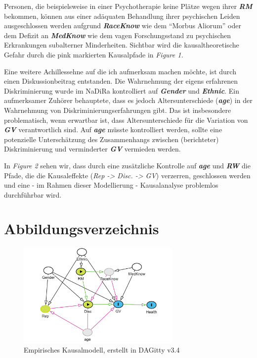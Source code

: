 \documentclass[
  11pt,
  oneside]{article}
\begin{document}
Personen, die beispielsweise in einer Psychotherapie keine Plätze wegen
ihrer \textbf{\emph{RM}} bekommen, können aus einer adäquaten Behandlung
ihrer psychischen Leiden ausgeschlossen werden aufgrund
\textbf{\emph{RaceKnow}} wie dem ``Morbus Aliorum'' oder dem Defizit an
\textbf{\emph{MedKnow}} wie dem vagen Forschungsstand zu psychischen
Erkrankungen subalterner Minderheiten. Sichtbar wird die
kausaltheoretische Gefahr durch die pink markierten Kausalpfade in
\emph{Figure 1.}

Eine weitere Achillessehne auf die ich aufmerksam machen möchte, ist
durch einen Diskussionbeitrag entstanden. Die Wahrnehmung der eigens
erfahrenen Diskriminierung wurde im NaDiRa kontrolliert auf
\textbf{\emph{Gender}} und \textbf{\emph{Ethnic}}. Ein aufmerksamer
Zuhörer behauptete, dass es jedoch Altersunterschiede
(\textbf{\emph{age}}) in der Wahrnehmung von Diskriminierungserfahrungen
gibt. Das ist insbesondere problematisch, wenn erwartbar ist, dass
Altersunterschiede für die Variation von \textbf{\emph{GV}}
verantwortlich sind. Auf \textbf{\emph{age}} müsste kontrolliert werden,
sollte eine potenzielle Unterschätzung des Zusammenhangs zwischen
(berichteter) Diskriminierung und verminderter \textbf{\emph{GV}}
vermieden werden.

In \emph{Figure 2} sehen wir, dass durch eine zusätzliche Kontrolle auf
\textbf{\emph{age}} und \textbf{\emph{RW}} die Pfade, die die
Kausaleffekte (\emph{Rep -\textgreater{} Disc. -\textgreater{} GV})
verzerren, geschlossen werden und eine - im Rahmen dieser Modellierung -
Kausalanalyse problemlos durchführbar wird.

\hypertarget{abbildungsverzeichnis}{%
\section{Abbildungsverzeichnis}\label{abbildungsverzeichnis}}

\begin{figure}
\centering
\includegraphics[width=3.125in,height=\textheight]{dagitty-model (5).png}
\caption{Empirisches Kausalmodell, erstellt in DAGitty v3.4}
\end{figure}
\end{document}
